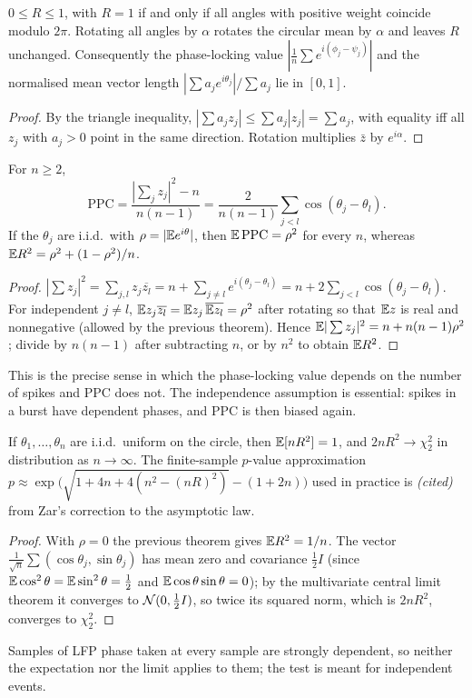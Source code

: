 \begin{theorem}\label{ars:circ-001}
$0\le R\le1$, with $R=1$ if and only if all angles with positive weight coincide modulo $2\pi$. Rotating all angles by $\alpha$ rotates the circular mean by $\alpha$ and leaves $R$ unchanged. Consequently the phase-locking value $|\frac1n\sum e^{i(\phi_j-\psi_j)}|$ and the normalised mean vector length $|\sum a_je^{i\theta_j}|/\sum a_j$ lie in $[0,1]$.
\end{theorem}
\begin{proof}
By the triangle inequality, $|\sum a_jz_j|\le\sum a_j|z_j|=\sum a_j$, with equality iff all $z_j$ with $a_j>0$ point in the same direction. Rotation multiplies $\bar z$ by $e^{i\alpha}$.
\end{proof}

\begin{theorem}\label{ars:circ-002}
For $n\ge2$,
\[\mathrm{PPC}=\frac{|\sum_jz_j|^2-n}{n(n-1)}=\frac{2}{n(n-1)}\sum_{j<l}\cos(\theta_j-\theta_l).\]
If the $\theta_j$ are i.i.d.\ with $\rho=|\mathbb E e^{i\theta}|$, then $\mathbb E\,\mathrm{PPC}=\rho^2$ for every $n$, whereas $\mathbb E R^2=\rho^2+(1-\rho^2)/n$.
\end{theorem}
\begin{proof}
$|\sum z_j|^2=\sum_{j,l}z_j\overline{z_l}=n+\sum_{j\ne l}e^{i(\theta_j-\theta_l)}=n+2\sum_{j<l}\cos(\theta_j-\theta_l)$. For independent $j\ne l$, $\mathbb E z_j\overline{z_l}=\mathbb E z_j\,\overline{\mathbb E z_l}=\rho^2$ after rotating so that $\mathbb E z$ is real and nonnegative (allowed by the previous theorem). Hence $\mathbb E|\sum z_j|^2=n+n(n-1)\rho^2$; divide by $n(n-1)$ after subtracting $n$, or by $n^2$ to obtain $\mathbb E R^2$.
\end{proof}
This is the precise sense in which the phase-locking value depends on the number of spikes and PPC does not. The independence assumption is essential: spikes in a burst have dependent phases, and PPC is then biased again.

\begin{theorem}\label{ars:circ-003}
If $\theta_1,\dots,\theta_n$ are i.i.d.\ uniform on the circle, then $\mathbb E[nR^2]=1$, and $2nR^2\to\chi^2_2$ in distribution as $n\to\infty$. The finite-sample $p$-value approximation $p\approx\exp\bigl(\sqrt{1+4n+4(n^2-(nR)^2)}-(1+2n)\bigr)$ used in practice is \emph{(cited)} from Zar's correction to the asymptotic law.
\end{theorem}
\begin{proof}
With $\rho=0$ the previous theorem gives $\mathbb E R^2=1/n$. The vector $\frac1{\sqrt n}\sum(\cos\theta_j,\sin\theta_j)$ has mean zero and covariance $\frac12I$ (since $\mathbb E\cos^2\theta=\mathbb E\sin^2\theta=\tfrac12$ and $\mathbb E\cos\theta\sin\theta=0$); by the multivariate central limit theorem it converges to $\mathcal{N}(0,\tfrac12I)$, so twice its squared norm, which is $2nR^2$, converges to $\chi^2_2$.
\end{proof}
Samples of LFP phase taken at every sample are strongly dependent, so neither the expectation nor the limit applies to them; the test is meant for independent events.

